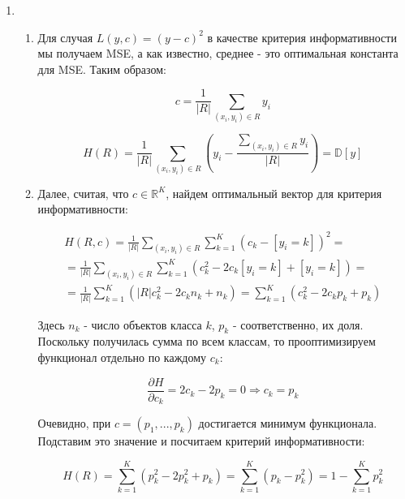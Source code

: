\documentclass{article}
\begin{document}
\begin{enumerate}
    \item
    \begin{enumerate}
        \item Для случая $ L(y, c) = {(y - c)}^2 $ в качестве критерия информативности мы получаем MSE, а как известно, среднее - это оптимальная константа
        для MSE. Таким образом:

        \small
        \begin{equation*}
            c = \frac{1}{|R|} \sum_{(x_i, y_i) \in R} y_i
        \end{equation*}

        \begin{equation*}
            H(R) = \frac{1}{|R|} \sum_{(x_i, y_i) \in R} \left( y_i - \frac{\sum_{(x_i, y_i) \in R} y_i}{|R|}\right) = \mathbb{D} \left[ y \right]
        \end{equation*}
        \normalsize

        \item Далее, считая, что $ c \in \mathbb{R}^K $, найдем оптимальный вектор для критерия информативности:

        \small
        \begin{gather*}
            H(R, c) = \frac{1}{|R|} \sum_{(x_i, y_i) \in R} \sum_{k=1}^K {(c_k - \left[ y_i = k \right])}^2 = \\
            = \frac{1}{|R|} \sum_{(x_i, y_i) \in R} \sum_{k=1}^K (c_k^2 - 2 c_k \left[ y_i = k \right] + \left[ y_i = k \right]) = \\
            = \frac{1}{|R|} \sum_{k=1}^K (|R| c_k^2 - 2 c_k n_k + n_k) = \sum_{k=1}^K (c_k^2 - 2 c_k p_k + p_k)
        \end{gather*}
        \normalsize

        Здесь $ n_k $ - число объектов класса $ k $, $ p_k $ - соответственно, их доля. Поскольку получилась сумма по всем классам,
        то прооптимизируем функционал отдельно по каждому $ c_k $:

        \small
        \begin{equation*}
            \frac{\partial H}{\partial c_k} = 2 c_k - 2 p_k = 0 \Rightarrow c_k = p_k
        \end{equation*}
        \normalsize

        Очевидно, при $ c = (p_1, ..., p_k) $ достигается минимум функционала. Подставим это значение и посчитаем критерий информативности:

        \small
        \begin{equation*}
            H(R) = \sum_{k=1}^K (p_k^2 - 2 p_k^2 + p_k) = \sum_{k=1}^K (p_k - p_k^2) = 1 - \sum_{k=1}^K p_k^2
        \end{equation*}
        \normalsize


\end{enumerate}
\end{enumerate}
\end{document}
